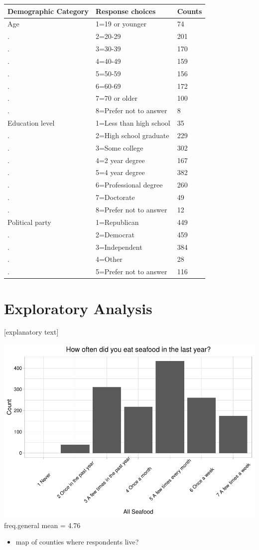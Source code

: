\documentclass[
  12pt,
]{article}
\providecommand{\tightlist}{%
  \setlength{\itemsep}{0pt}\setlength{\parskip}{0pt}}
\begin{document}
\begin{longtable}[]{@{}lll@{}}
\toprule
Demographic Category & Response choices & Counts\tabularnewline
\midrule
\endhead
Age & 1=19 or younger & 74\tabularnewline
. & 2=20-29 & 201\tabularnewline
. & 3=30-39 & 170\tabularnewline
. & 4=40-49 & 159\tabularnewline
. & 5=50-59 & 156\tabularnewline
. & 6=60-69 & 172\tabularnewline
. & 7=70 or older & 100\tabularnewline
. & 8=Prefer not to answer & 8\tabularnewline
Education level & 1=Less than high school & 35\tabularnewline
. & 2=High school graduate & 229\tabularnewline
. & 3=Some college & 302\tabularnewline
. & 4=2 year degree & 167\tabularnewline
. & 5=4 year degree & 382\tabularnewline
. & 6=Professional degree & 260\tabularnewline
. & 7=Doctorate & 49\tabularnewline
. & 8=Prefer not to answer & 12\tabularnewline
Political party & 1=Republican & 449\tabularnewline
. & 2=Democrat & 459\tabularnewline
. & 3=Independent & 384\tabularnewline
. & 4=Other & 28\tabularnewline
. & 5=Prefer not to answer & 116\tabularnewline
\bottomrule
\end{longtable}

\newpage

\hypertarget{exploratory-analysis}{%
\section{Exploratory Analysis}\label{exploratory-analysis}}

{[}explanatory text{]}

\includegraphics{Final_rmd_files/figure-latex/freq general-1.pdf}
freq.general mean = 4.76

\begin{itemize}
\tightlist
\item
  map of counties where respondents live?
\end{itemize}
\end{document}
